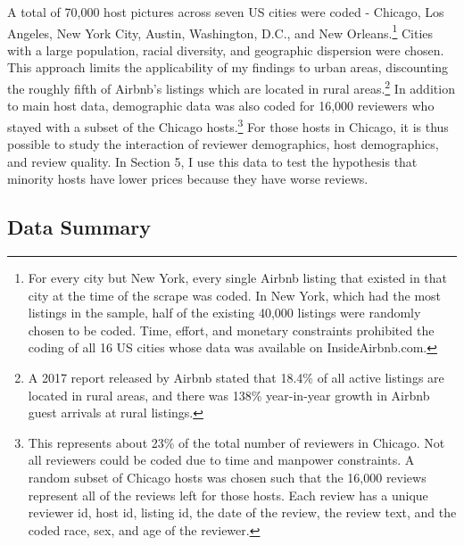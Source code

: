 \documentclass[11pt, oneside]{article}
\begin{document}
A total of 70,000 host pictures across seven US cities were coded - Chicago, Los Angeles, New York City, Austin, Washington, D.C., and New Orleans.\footnote{For every city but New York, every single Airbnb listing that existed in that city at the time of the scrape was coded. In New York, which had the most listings in the sample, half of the existing 40,000 listings were randomly chosen to be coded. Time, effort, and monetary constraints prohibited the coding of all 16 US cities whose data was available on InsideAirbnb.com.} Cities with a large population, racial diversity, and geographic dispersion were chosen. This approach limits the applicability of my findings to urban areas, discounting the roughly fifth of Airbnb's listings which are located in rural areas.\footnote{A 2017 report released by Airbnb stated that 18.4\% of all active listings are located in rural areas, and there was 138\% year-in-year growth in Airbnb guest arrivals at rural listings.} In addition to main host data, demographic data was also coded for 16,000 reviewers who stayed with a subset of the Chicago hosts.\footnote{This represents about 23\% of the total number of reviewers in Chicago. Not all reviewers could be coded due to time and manpower constraints. A random subset of Chicago hosts was chosen such that the 16,000 reviews represent all of the reviews left for those hosts. Each review has a unique reviewer id, host id, listing id, the date of the review, the review text, and the coded race, sex, and age of the reviewer.} For those hosts in Chicago, it is thus possible to study the interaction of reviewer demographics, host demographics, and review quality. In Section 5, I use this data to test the hypothesis that minority hosts have lower prices because they have worse reviews. 



\subsection{Data Summary} %
\end{document}
